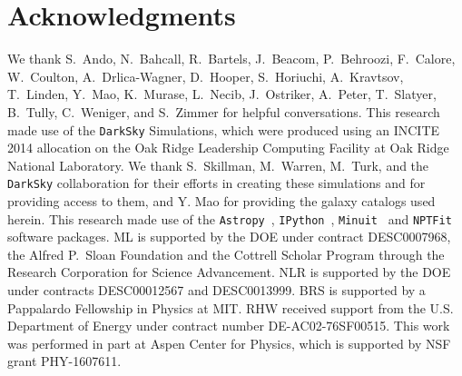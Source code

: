 \section*{Acknowledgments}
We thank S.~Ando, N.~Bahcall, R.~Bartels, J.~Beacom, P.~Behroozi, F.~Calore, W.~Coulton, A.~Drlica-Wagner, D.~Hooper, S.~Horiuchi, A.~Kravtsov, T.~Linden, Y.~Mao, K.~Murase, L.~Necib, J.~Ostriker, A.~Peter, T.~Slatyer, B.~Tully, C.~Weniger, and S.~Zimmer for helpful conversations. This research made use of the \texttt{DarkSky} Simulations, which were produced using an INCITE 2014 allocation on the Oak Ridge Leadership Computing Facility at Oak Ridge National Laboratory.  We thank S.~Skillman, M.~Warren, M.~Turk, and the \texttt{DarkSky} collaboration for their efforts in creating these simulations and for providing access to them, and Y. Mao for providing the galaxy catalogs used herein.
 This research made use of the \texttt{Astropy}~\cite{2013A&A...558A..33A}, \texttt{IPython}~\cite{PER-GRA:2007}, \texttt{Minuit}~\cite{James:1975dr} and \texttt{NPTFit}~\cite{Mishra-Sharma:2016gis}  software packages.
ML is supported by the DOE under contract DESC0007968, the Alfred P.~Sloan Foundation and the Cottrell Scholar Program through the Research Corporation for Science Advancement.  NLR is supported by the DOE under contracts DESC00012567 and DESC0013999.  BRS is supported by a Pappalardo Fellowship in Physics at MIT. RHW received support from the U.S. Department of Energy under contract number DE-AC02-76SF00515. This work was performed in part at Aspen Center for Physics, which is supported by NSF grant PHY-1607611.